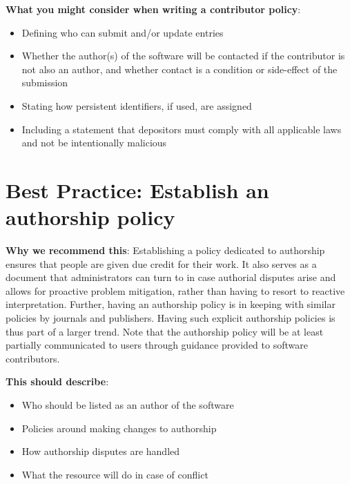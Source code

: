 \documentclass[11pt]{article}
\begin{document}
\textbf{What you might consider when writing a contributor policy}:

\begin{itemize}
\item Defining who can submit and/or update entries

\item Whether the author(s) of the software will be contacted if the contributor is not also an author, and whether contact is a condition or side-effect of the submission

\item Stating how persistent identifiers, if used, are assigned

\item Including a statement that depositors must comply with all applicable laws and not be intentionally malicious

\end{itemize}


\section{Best Practice: Establish an authorship policy}
\label{best-practice-establish-an-authorship-policy}

\textbf{Why we recommend this}: Establishing a policy dedicated to authorship ensures that people are given due credit for their work. It also serves as a document that administrators can turn to in case authorial disputes arise and allows for proactive problem mitigation, rather than having to resort to reactive interpretation. Further, having an authorship policy is in keeping with similar policies by journals and publishers. Having such explicit authorship policies is thus part of a larger trend. Note that the authorship policy will be at least partially communicated to users through guidance provided to software contributors.

\textbf{This should describe}:

\begin{itemize}
\item Who should be listed as an author of the software

\item Policies around making changes to authorship

\item How authorship disputes are handled

\item What the resource will do in case of conflict

\end{itemize}
\end{document}
